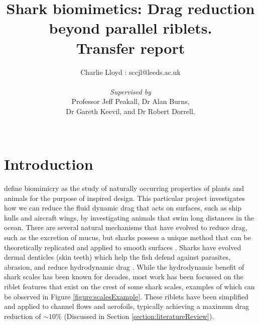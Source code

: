 \documentclass[12pt,oneside,a4paper]{article}
\title{Shark biomimetics: Drag reduction beyond parallel riblets.
\\
 Transfer report
}
\author{Charlie Lloyd : sccjl@leeds.ac.uk
\\\\
\textit{Supervised by}
\\
Professor Jeff Peakall, Dr Alan Burns,
\\
Dr Gareth Keevil, and Dr Robert Dorrell.
\\\\}
\begin{document}
\maketitle



\newpage

\tableofcontents

\newpage
{}
\section{Introduction}
\cite{dean2010} define biomimicry as the study of naturally occurring properties of plants and animals for the purpose of inspired design. This particular project investigates how we can reduce the fluid dynamic drag that acts on surfaces, such as ship hulls and aircraft wings, by investigating animals that swim long distances in the ocean. There are several natural mechanisms that have evolved to reduce drag, such as the excretion of mucus, but sharks possess a unique method that can be theoretically replicated and applied to smooth surfaces \citep{dean2010}. Sharks have evolved dermal denticles (skin teeth) which help the fish defend against parasites, abrasion, and reduce hydrodynamic drag \citep{fletcher2014}. While the hydrodynamic benefit of shark scales has been known for decades, most work has been focussed on the riblet features that exist on the crest of some shark scales, examples of which can be observed in Figure \ref{figure:scalesExample}. These riblets have been simplified and applied to channel flows and aerofoils, typically achieving a maximum drag reduction of $\sim 10\%$ (Discussed in Section \ref{section:literatureReview}).
\end{document}
